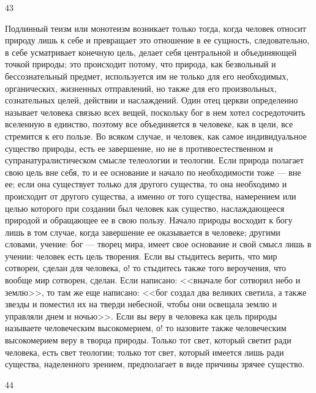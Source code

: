 \documentclass[12pt]{article}
\begin{document}
43

Подлинный теизм или монотеизм возникает только тогда, когда человек относит природу лишь к себе и превращает это отношение в ее сущность, следовательно, в себе усматривает конечную цель, делает себя центральной и объединяющей точкой природы; это происходит потому, что природа, как безвольный и бессознательный предмет, используется им не только для его необходимых, органических, жизненных отправлений, но также для его произвольных, сознательных целей, действии и наслаждений. Один отец церкви определенно называет человека связью всех вещей, поскольку бог в нем хотел сосредоточить вселенную в единство, поэтому все объединяется в человеке, как в цели, все стремится к его пользе. Во всяком случае, и человек, как самое индивидуальное существо природы, есть ее завершение, но не в противоестественном и супранатуралистическом смысле телеологии и теологии. Если природа полагает свою цель вне себя, то и ее основание и начало по необходимости тоже --- вне ее; если она существует только для другого существа, то она необходимо и происходит от другого существа, а именно от того существа, намерением или целью которого при создании был человек как существо, наслаждающееся природой и обращающее ее в свою пользу. Начало природы восходит к богу лишь в том случае, когда завершение ее оказывается в человеке; другими словами, учение: бог --- творец мира, имеет свое основание и свой смысл лишь в учении: человек есть цель творения. Если вы стыдитесь верить, что мир сотворен, сделан для человека, о! то стыдитесь также того вероучения, что вообще мир сотворен, сделан. Если написано: <<вначале бог сотворил небо и землю>>, то там же еще написано: <<бог создал два великих светила, а также звезды и поместил их на тверди небесной, чтобы они освещала землю и управляли днем и ночью>>. Если вы веру в человека как цель природы называете человеческим высокомерием, о! то назовите также человеческим высокомерием веру в творца природы. Только тот свет, который светит ради человека, есть свет теологии; только тот свет, который имеется лишь ради существа, наделенного зрением, предполагает в виде причины зрячее существо.



44
\end{document}
